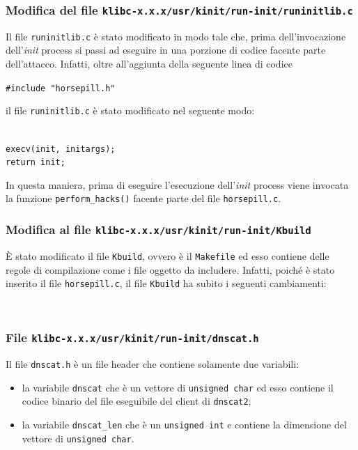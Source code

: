 \documentclass[oneside]{article}
\begin{document}
\newpage
\subsubsection{Modifica del file \texttt{klibc-x.x.x/usr/kinit/run-init/runinitlib.c}}
Il file \texttt{runinitlib.c} è stato modificato in modo tale che, prima dell'invocazione dell'\textit{init} process si passi ad eseguire in una porzione di codice facente parte dell'attacco. Infatti, oltre all'aggiunta della seguente linea di codice 
\begin{center}
\texttt{\#include "horsepill.h"}
\end{center}
il file \texttt{runinitlib.c} è stato modificato nel seguente modo:

\begin{tcolorbox}
{}\\
\texttt{execv(init, initargs);}\\
\texttt{return init;}
\end{tcolorbox}

In questa maniera, prima di eseguire l'esecuzione dell'\textit{init} process viene invocata la funzione \texttt{perform\_hacks()} facente parte del file \texttt{horsepill.c}.

\subsubsection{Modifica al file \texttt{klibc-x.x.x/usr/kinit/run-init/Kbuild}}
È stato modificato il file \texttt{Kbuild}, ovvero è il \texttt{Makefile} ed esso contiene delle regole di compilazione come i file oggetto da includere. Infatti, poiché è stato inserito il file \texttt{horsepill.c}, il file \texttt{Kbuild} ha subito i seguenti cambiamenti:
\begin{tcolorbox}
{}\\
{}
\end{tcolorbox}

\subsubsection{File \texttt{klibc-x.x.x/usr/kinit/run-init/dnscat.h}}
Il file \texttt{dnscat.h} è un file header che contiene solamente due variabili:
\begin{itemize}
\item la variabile \texttt{dnscat} che è un vettore di \texttt{unsigned char} ed esso contiene il codice binario del file eseguibile del client di \texttt{dnscat2};
\item la variabile \texttt{dnscat\_len} che è un \texttt{unsigned int} e contiene la dimensione del vettore di \texttt{unsigned char}.
\end{itemize}
\end{document}
